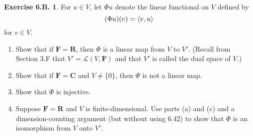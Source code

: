 \documentclass[12pt]{article}
\theoremstyle{definition}
\theoremstyle{exercise}
\newtheorem{exercise}{Exercise 6.B.}
\theoremstyle{solution}
\newcommand{\lmap}{\mathcal{L}}
\newcommand{\R}{\mathbf{R}}
\newcommand{\C}{\mathbf{C}}
\newcommand{\F}{\mathbf{F}}
\DeclarePairedDelimiter\ip{\langle}{\rangle}
\begin{document}
\begin{exercise}
\label{ex:17}
    For \( u \in V \), let \( \Phi u \) denote the linear functional on \( V \) defined by
    \[
        (\Phi u)(v) = \ip{v, u}
    \]
    for \( v \in V \).
    \begin{enumerate}
        \item Show that if \( \F = \R \), then \( \Phi \) is a linear map from \( V \) to \( V' \). (Recall from Section 3.F that \( V' = \lmap(V, \F) \) and that \( V' \) is called the dual space of \( V \).)

        \item Show that if \( \F = \C \) and \( V \neq \{ 0 \} \), then \( \Phi \) is not a linear map.

        \item Show that \( \Phi \) is injective.

        \item Suppose \( \F = \R \) and \( V \) is finite-dimensional. Use parts (a) and (c) and a dimension-counting argument (but without using 6.42) to show that \( \Phi \) is an isomorphism from \( V \) onto \( V' \).
    \end{enumerate}

    \noindent [\textit{Part (d) gives an alternative proof of the Riesz Representation Theorem (6.42) when \( \F = \R \). Part (d) also gives a natural isomorphism (meaning that it does not depend on a choice of basis) from a finite-dimensional real inner product space onto its dual space.}]
\end{exercise}
\end{document}

